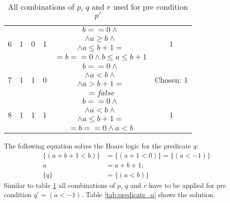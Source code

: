 \begin{table}
\begin{tabular}{ | c | c | c | c | c | c | }
    \multirow{4}{*}{6} & \multirow{4}{*}{1} & \multirow{4}{*}{0} & \multirow{4}{*}{1} & $b == 0 \land $ & \multirow{4}{*}{1} \\
    & & & & $\land a \ge b \land$ & \\
    & & & & $\land a \le b + 1 =$ & \\
    & & & & $= b == 0 \land b \le a \le b + 1$ & \\ \hline

    \multirow{4}{*}{7} & \multirow{4}{*}{1} & \multirow{4}{*}{1} & \multirow{4}{*}{0} & $b == 0 \land $ & \multirow{4}{*}{Chosen: 1} \\
    & & & & $\land a < b \land$ & \\
    & & & & $\land a > b + 1 =$ & \\
    & & & & $= false$ & \\ \hline

    \multirow{4}{*}{8} & \multirow{4}{*}{1} & \multirow{4}{*}{1} & \multirow{4}{*}{1} & $b == 0 \land $ & \multirow{4}{*}{1} \\
    & & & & $\land a < b \land$ & \\
    & & & & $\land a \le b + 1 =$ & \\
    & & & & $= b == 0 \land a < b$ & \\ \hline
  \end{tabular}
  \caption{All combinations of $p$, $q$ and $r$ used for pre condition $p'$}
  \label{tab:predicate_p}
\end{table}

The following equation solves the Hoare logic for the predicate $q$:
\begin{equation}
\begin{array}{rl}
\{ (a + b + 1 < b) \} &= \{ (a + 1 < 0) \} = \{ (a < -1) \}\\
a &= a + b + 1;\\
\{q\} &= \{ (a < b) \}
\end{array}
\end{equation}
Similar to table \ref{tab:predicate_p} all combinations of $p$, $q$ and $r$ have to be applied for pre condition $q' = (a < -1)$. Table \ref{tab:predicate_q} shows the solution.

